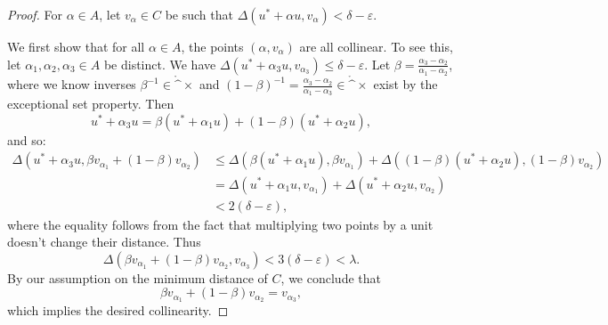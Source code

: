 \begin{proof}
For $\alpha \in A$, let $v_\alpha \in C$ be such that $\Delta(u^\ast + \alpha u, v_\alpha) < \delta - \varepsilon$.

We first show that for all $\alpha \in A$, the points $(\alpha, v_\alpha)$ are all collinear. To see this, let
$\alpha_1, \alpha_2, \alpha_3 \in A$ be distinct. We have $\Delta(u^\ast + \alpha_3 u, v_{\alpha_3}) \le \delta - \varepsilon$.
Let $\beta = \frac{\alpha_3 - \alpha_2}{\alpha_1 - \alpha_2}$, where we know inverses $\beta^{-1} \in \ring^\times$ and $(1-\beta)^{-1} = \frac{\alpha_3 - \alpha_2}{\alpha_1 - \alpha_3} \in \ring^\times$ exist by the exceptional set property. Then
\[
u^\ast + \alpha_3 u = \beta(u^\ast + \alpha_1 u) + (1-\beta)(u^\ast + \alpha_2 u),
\]
and so:
\[
\begin{array}{rl}
\Delta(u^\ast + \alpha_3 u, \beta v_{\alpha_1} + (1-\beta)v_{\alpha_2}) &\leq \Delta(\beta(u^\ast + \alpha_1 u), \beta v_{\alpha_1}) + \Delta((1-\beta)(u^\ast + \alpha_2 u), (1-\beta) v_{\alpha_2}) \\
&= \Delta(u^\ast + \alpha_1 u, v_{\alpha_1}) + \Delta(u^\ast + \alpha_2 u, v_{\alpha_2})  \\
&< 2(\delta - \varepsilon),
\end{array}
\]
where the equality follows from the fact that multiplying two points by a unit doesn't change their distance. Thus
\[
\Delta(\beta v_{\alpha_1} + (1-\beta) v_{\alpha_2}, v_{\alpha_3})<  3(\delta - \varepsilon) < \lambda.
\]
By our assumption on the minimum distance of $C$, we conclude that
\[
\beta v_{\alpha_1} + (1-\beta) v_{\alpha_2} = v_{\alpha_3},
\]
which implies the desired collinearity.


\end{proof}
